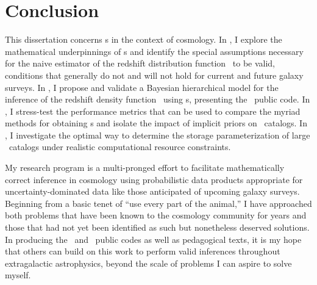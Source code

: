 \chapter*{Conclusion}

This dissertation concerns \pzpdf s in the context of cosmology.
In , I explore the mathematical underpinnings of \pzpdf s and identify the special assumptions necessary for the naive estimator of the redshift distribution function \Nz\ to be valid, conditions that generally do not and will not hold for current and future galaxy surveys.
In , I propose and validate a Bayesian hierarchical model for the inference of the redshift density function \nz\ using \pzpdf s, presenting the \chippr\ public code.
In , I stress-test the performance metrics that can be used to compare the myriad methods for obtaining \pzpdf s and isolate the impact of implicit priors on \pzpdf\ catalogs.
In , I investigate the optimal way to determine the storage parameterization of large \pzpdf\ catalogs under realistic computational resource constraints. 




My research program is a multi-pronged effort to facilitate mathematically correct inference in cosmology using probabilistic data products appropriate for uncertainty-dominated data like those anticipated of upcoming galaxy surveys.
Beginning from a basic tenet of ``use every part of the animal,'' I have approached both problems that have been known to the cosmology community for years and those that had not yet been identified as such but nonetheless deserved solutions.
In producing the \qp\ and \chippr\ public codes as well as pedagogical texts, it is my hope that others can build on this work to perform valid inferences throughout extragalactic astrophysics, beyond the scale of problems I can aspire to solve myself.

